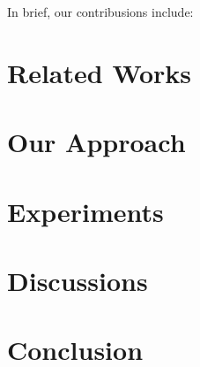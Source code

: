 \documentclass[10pt,twocolumn,letterpaper]{article}
\begin{document}
In brief, our contribusions include:

\section{Related Works}
\label{sec:2}

\section{Our Approach}
\label{sec:3}

\section{Experiments}
\label{sec:4}

\section{Discussions}
\label{sec:5}

\section{Conclusion}
\label{sec:6}

\cite{Authors14}

{\small


}
\end{document}
